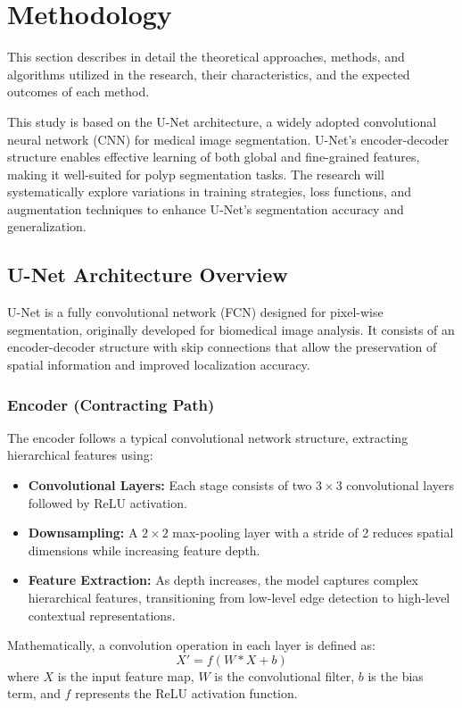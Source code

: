 \chapter{Methodology}

This section describes in detail the theoretical approaches, methods, and algorithms utilized in the research, their characteristics, and the expected outcomes of each method.

This study is based on the U-Net architecture, a widely adopted convolutional neural network (CNN) for medical image segmentation. U-Net’s encoder-decoder structure enables effective learning of both global and fine-grained features, making it well-suited for polyp segmentation tasks. The research will systematically explore variations in training strategies, loss functions, and augmentation techniques to enhance U-Net’s segmentation accuracy and generalization.

\section{U-Net Architecture Overview}
U-Net is a fully convolutional network (FCN) designed for pixel-wise segmentation, originally developed for biomedical image analysis. It consists of an encoder-decoder structure with skip connections that allow the preservation of spatial information and improved localization accuracy.

\subsection{Encoder (Contracting Path)}
The encoder follows a typical convolutional network structure, extracting hierarchical features using:
\begin{itemize}
    \item \textbf{Convolutional Layers:} Each stage consists of two \(3 \times 3\) convolutional layers followed by ReLU activation.
    \item \textbf{Downsampling:} A \(2 \times 2\) max-pooling layer with a stride of 2 reduces spatial dimensions while increasing feature depth.
    \item \textbf{Feature Extraction:} As depth increases, the model captures complex hierarchical features, transitioning from low-level edge detection to high-level contextual representations.
\end{itemize}
Mathematically, a convolution operation in each layer is defined as:
\begin{equation}
    X' = f(W * X + b)
\end{equation}
where \(X\) is the input feature map, \(W\) is the convolutional filter, \(b\) is the bias term, and \(f\) represents the ReLU activation function.

